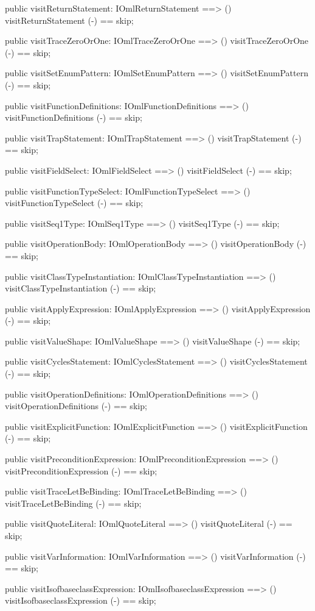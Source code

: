 \begin{vdm_al}
  public visitReturnStatement: IOmlReturnStatement ==> ()
  visitReturnStatement (-) == skip;

  public visitTraceZeroOrOne: IOmlTraceZeroOrOne ==> ()
  visitTraceZeroOrOne (-) == skip;

  public visitSetEnumPattern: IOmlSetEnumPattern ==> ()
  visitSetEnumPattern (-) == skip;

  public visitFunctionDefinitions: IOmlFunctionDefinitions ==> ()
  visitFunctionDefinitions (-) == skip;

  public visitTrapStatement: IOmlTrapStatement ==> ()
  visitTrapStatement (-) == skip;

  public visitFieldSelect: IOmlFieldSelect ==> ()
  visitFieldSelect (-) == skip;

  public visitFunctionTypeSelect: IOmlFunctionTypeSelect ==> ()
  visitFunctionTypeSelect (-) == skip;

  public visitSeq1Type: IOmlSeq1Type ==> ()
  visitSeq1Type (-) == skip;

  public visitOperationBody: IOmlOperationBody ==> ()
  visitOperationBody (-) == skip;

  public visitClassTypeInstantiation: IOmlClassTypeInstantiation ==> ()
  visitClassTypeInstantiation (-) == skip;

  public visitApplyExpression: IOmlApplyExpression ==> ()
  visitApplyExpression (-) == skip;

  public visitValueShape: IOmlValueShape ==> ()
  visitValueShape (-) == skip;

  public visitCyclesStatement: IOmlCyclesStatement ==> ()
  visitCyclesStatement (-) == skip;

  public visitOperationDefinitions: IOmlOperationDefinitions ==> ()
  visitOperationDefinitions (-) == skip;

  public visitExplicitFunction: IOmlExplicitFunction ==> ()
  visitExplicitFunction (-) == skip;

  public visitPreconditionExpression: IOmlPreconditionExpression ==> ()
  visitPreconditionExpression (-) == skip;

  public visitTraceLetBeBinding: IOmlTraceLetBeBinding ==> ()
  visitTraceLetBeBinding (-) == skip;

  public visitQuoteLiteral: IOmlQuoteLiteral ==> ()
  visitQuoteLiteral (-) == skip;

  public visitVarInformation: IOmlVarInformation ==> ()
  visitVarInformation (-) == skip;

  public visitIsofbaseclassExpression: IOmlIsofbaseclassExpression ==> ()
  visitIsofbaseclassExpression (-) == skip;


\end{vdm_al}
